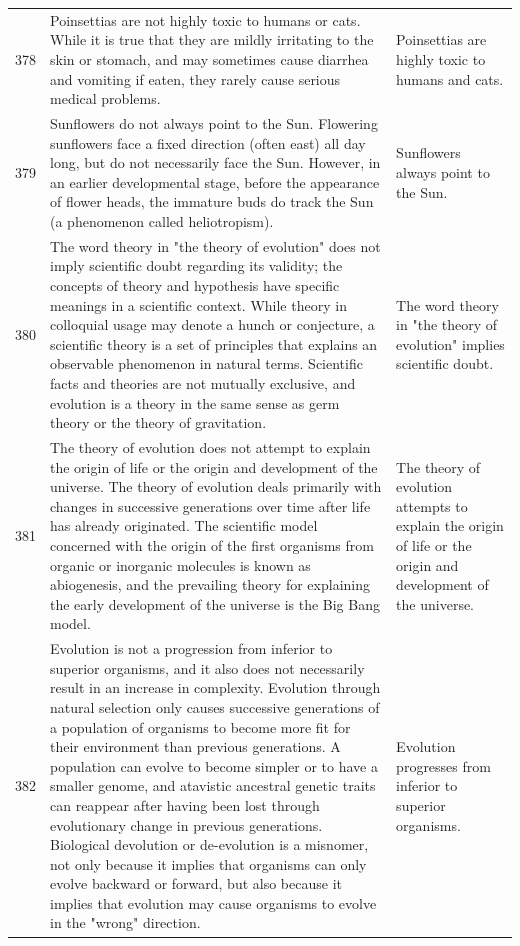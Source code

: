 \begin{tabular}{c|p{}|p{}}
378 & Poinsettias are not highly toxic to humans or cats. While it is true that they are mildly irritating to the skin or stomach, and may sometimes cause diarrhea and vomiting if eaten, they rarely cause serious medical problems. & Poinsettias are highly toxic to humans and cats. \\
379 & Sunflowers do not always point to the Sun. Flowering sunflowers face a fixed direction (often east) all day long, but do not necessarily face the Sun. However, in an earlier developmental stage, before the appearance of flower heads, the immature buds do track the Sun (a phenomenon called heliotropism). & Sunflowers always point to the Sun. \\
380 & The word theory in "the theory of evolution" does not imply scientific doubt regarding its validity; the concepts of theory and hypothesis have specific meanings in a scientific context. While theory in colloquial usage may denote a hunch or conjecture, a scientific theory is a set of principles that explains an observable phenomenon in natural terms. Scientific facts and theories are not mutually exclusive, and evolution is a theory in the same sense as germ theory or the theory of gravitation. & The word theory in "the theory of evolution" implies scientific doubt. \\
381 & The theory of evolution does not attempt to explain the origin of life or the origin and development of the universe. The theory of evolution deals primarily with changes in successive generations over time after life has already originated. The scientific model concerned with the origin of the first organisms from organic or inorganic molecules is known as abiogenesis, and the prevailing theory for explaining the early development of the universe is the Big Bang model. & The theory of evolution attempts to explain the origin of life or the origin and development of the universe. \\
382 & Evolution is not a progression from inferior to superior organisms, and it also does not necessarily result in an increase in complexity. Evolution through natural selection only causes successive generations of a population of organisms to become more fit for their environment than previous generations. A population can evolve to become simpler or to have a smaller genome, and atavistic ancestral genetic traits can reappear after having been lost through evolutionary change in previous generations. Biological devolution or de-evolution is a misnomer, not only because it implies that organisms can only evolve backward or forward, but also because it implies that evolution may cause organisms to evolve in the "wrong" direction. & Evolution progresses from inferior to superior organisms. \\

\end{tabular}
